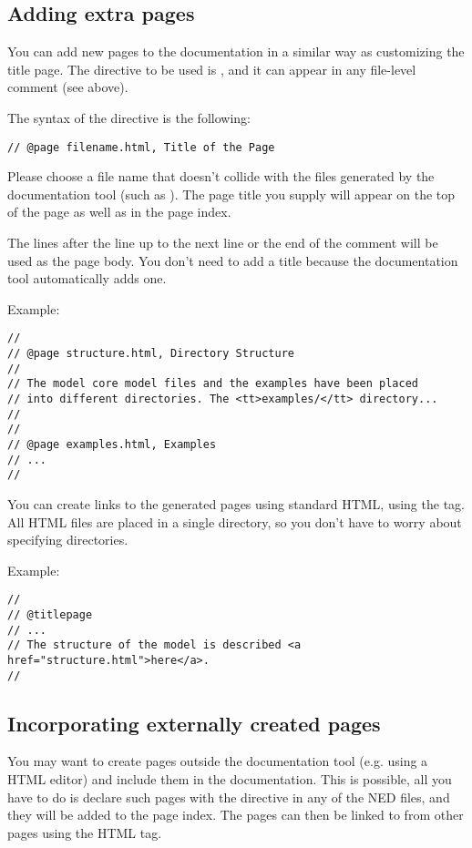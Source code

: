 \subsection{Adding extra pages}

You can add new pages to the documentation in a similar way as customizing
the title page. The directive to be used is , and it can
appear in any file-level comment (see above).

The syntax of the  directive is the following:

\begin{verbatim}
// @page filename.html, Title of the Page
\end{verbatim}

Please choose a file name that doesn't collide with the files generated
by the documentation tool (such as ).
The page title you supply will appear on the top of the page as well as
in the page index.

The lines after the  line up to the next  line
or the end of the comment will be used as the page body.
You don't need to add a title because the documentation tool
automatically adds one.

Example:
\begin{verbatim}
//
// @page structure.html, Directory Structure
//
// The model core model files and the examples have been placed
// into different directories. The <tt>examples/</tt> directory...
//
//
// @page examples.html, Examples
// ...
//
\end{verbatim}

You can create links to the generated pages using standard HTML,
using the  tag. All HTML files are
placed in a single directory, so you don't have to worry about
specifying directories.

Example:
\begin{verbatim}
//
// @titlepage
// ...
// The structure of the model is described <a href="structure.html">here</a>.
//
\end{verbatim}


\subsection{Incorporating externally created pages}

You may want to create pages outside the documentation tool
(e.g. using a HTML editor) and include them in the documentation.
This is possible, all you have to do is declare such pages with
the  directive in any of the NED files, and
they will be added to the page index. The pages can then be linked to
from other pages using the HTML  tag.

